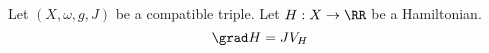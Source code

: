 

    Let $(X, \omega, g, J)$ be a compatible triple. Let $H:X\to \RR$ be a Hamiltonian. 
    \[\grad H = J V_H\]

